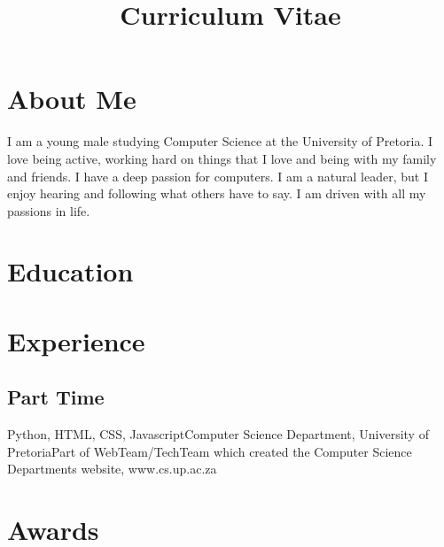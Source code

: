 \documentclass[11pt,a4paper,sans]{moderncv} %
\title{Curriculum Vitae}
\begin{document}
\makecvtitle %

\section{About Me}
I am a young male studying Computer Science at the University of Pretoria. I love being active, working hard on things that I love and being with my family and friends. I have a deep passion for computers. I am a natural leader, but I enjoy hearing and following what others have to say. I am driven with all my passions in life.



\section{Education}


\section{Experience}
\subsection{Part Time}
  {Python, HTML, CSS, Javascript}{Computer Science Department, University of Pretoria}{Part of WebTeam/TechTeam which created the Computer Science Departments website, www.cs.up.ac.za}{}{}




\section{Awards}

\end{document}

